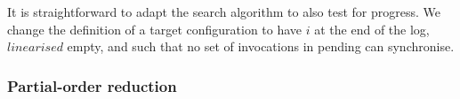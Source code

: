 

It is straightforward to adapt the search algorithm to also test for progress.
We change the definition of a target configuration to have $i$ at the end of
the log, $linearised$ empty, and such that no set of invocations in pending
can synchronise.  





\subsubsection{Partial-order reduction}

